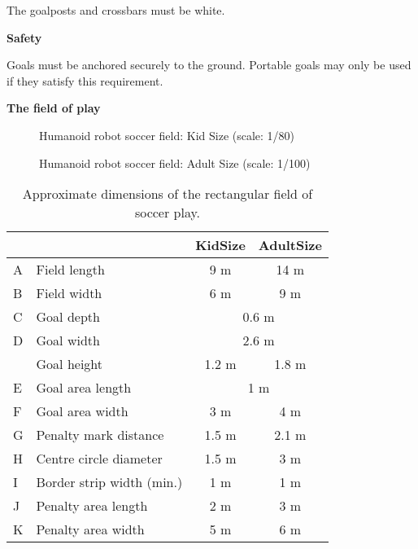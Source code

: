 \bigskip

The goalposts and crossbars must be white.

\bigskip

{\bfseries Safety}

\headlinebox

Goals must be anchored securely to the ground. Portable goals may only be used if they satisfy this requirement.

\bigskip

{\bfseries The field of play}

\headlinebox 

\begin{center}
\end{center}
\begin{figure}[h]
  \centering
  
  \caption{Humanoid robot soccer field: Kid Size (scale: 1/80)}
\end{figure}
\begin{figure}[h]
  \centering
  
  \caption{Humanoid robot soccer field: Adult Size (scale: 1/100)}
\end{figure}
\newpage

\begin{center}
\tablehead{}
\begin{table}[h]
\caption{Approximate dimensions of the rectangular field of soccer play.}
\centering
\begin{tabular}{|l|l|c|c|}
\hline
& & KidSize & AdultSize \\
\hline
A & Field length & 9 m & 14 m\\
\hline
B & Field width &  6 m & 9 m\\
\hline
C & Goal depth & \multicolumn{2}{c|}{0.6 m}\\
\hline
D & Goal width & \multicolumn{2}{c|}{2.6 m}\\
\hline
~ & Goal height & 1.2 m & 1.8 m\\
\hline
E & Goal area length & \multicolumn{2}{c|}{1 m}\\
\hline
F & Goal area width & 3 m & 4 m \\
\hline
G & Penalty mark distance & 1.5 m & 2.1 m\\
\hline
H & Centre circle diameter & 1.5 m & 3 m\\
\hline
I & Border strip width (min.) & 1 m & 1 m\\
\hline
J & Penalty area length & 2 m & 3 m\\
\hline
K & Penalty area width & 5 m & 6 m\\
\hline
\end{tabular}
\end{table}
\end{center}

